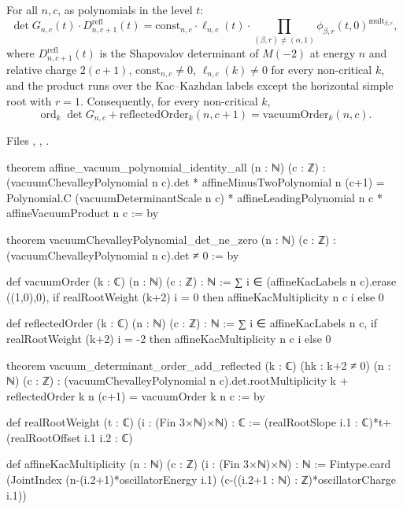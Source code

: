 \begin{theorem}\label{l20:thm:vacdet}
For all $n,c$, as polynomials in the level $t$:
\begin{equation*}
\det G_{n,c}(t)\cdot D^{\mathrm{refl}}_{n,c+1}(t)=\mathrm{const}_{n,c}\cdot\ell_{n,c}(t)\cdot
\prod_{(\beta,r)\neq(\alpha,1)}\phi_{\beta,r}(t,0)^{\mathrm{mult}_{\beta,r}},
\end{equation*}
where $D^{\mathrm{refl}}_{n,c+1}(t)$ is the Shapovalov determinant of $M(-2)$ at energy $n$ and relative charge
$2(c+1)$, $\mathrm{const}_{n,c}\neq0$, $\ell_{n,c}(k)\neq0$ for every non-critical $k$, and the product runs over
the Kac--Kazhdan labels except the horizontal simple root with $r=1$. Consequently, for every non-critical $k$,
\begin{equation*}
\operatorname{ord}_k\det G_{n,c}+\mathrm{reflectedOrder}_k(n,c+1)=\mathrm{vacuumOrder}_k(n,c).
\end{equation*}
\end{theorem}
\noindent Files ,
,
.
\begin{leancode}
theorem affine_vacuum_polynomial_identity_all (n : ℕ) (c : ℤ) :
    (vacuumChevalleyPolynomial n c).det * affineMinusTwoPolynomial n (c+1) =
      Polynomial.C (vacuumDeterminantScale n c) * affineLeadingPolynomial n c *
        affineVacuumProduct n c := by

theorem vacuumChevalleyPolynomial_det_ne_zero (n : ℕ) (c : ℤ) : (vacuumChevalleyPolynomial n c).det ≠ 0 := by

def vacuumOrder (k : ℂ) (n : ℕ) (c : ℤ) : ℕ :=
  ∑ i ∈ (affineKacLabels n c).erase ((1,0),0),
    if realRootWeight (k+2) i = 0 then affineKacMultiplicity n c i else 0

def reflectedOrder (k : ℂ) (n : ℕ) (c : ℤ) : ℕ :=
  ∑ i ∈ affineKacLabels n c,
    if realRootWeight (k+2) i = -2 then affineKacMultiplicity n c i else 0

theorem vacuum_determinant_order_add_reflected (k : ℂ) (hk : k+2 ≠ 0)
    (n : ℕ) (c : ℤ) :
    (vacuumChevalleyPolynomial n c).det.rootMultiplicity k + reflectedOrder k n (c+1) =
      vacuumOrder k n c := by

def realRootWeight (t : ℂ) (i : (Fin 3×ℕ)×ℕ) : ℂ :=
  (realRootSlope i.1 : ℂ)*t+(realRootOffset i.1 i.2 : ℂ)

def affineKacMultiplicity (n : ℕ) (c : ℤ) (i : (Fin 3×ℕ)×ℕ) : ℕ :=
  Fintype.card (JointIndex (n-(i.2+1)*oscillatorEnergy i.1)
    (c-((i.2+1 : ℕ) : ℤ)*oscillatorCharge i.1))
\end{leancode}

